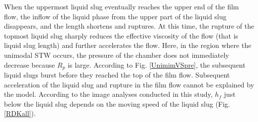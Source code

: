 \documentclass[aps,pre,preprint,groupedaddress,showkeys]{revtex4-2}
\begin{document}
When the uppermost liquid slug eventually reaches the upper end of the film flow, the inflow of the liquid phase from the upper part of the liquid slug disappears, and the length shortens and ruptures.
At this time, the rupture of the topmost liquid slug sharply reduces the effective viscosity of the flow (that is liquid slug length) and further accelerates the flow.
Here, in the region where the unimodal STW occurs, the pressure of the chamber does not immediately decrease because $ R_p $ is large.
According to Fig. \ref{UnimimVSpre}, the subsequent liquid slugs burst before they reached the top of the film flow.
Subsequent acceleration of the liquid slug and rupture in the film flow cannot be explained by the \cite{kanno 2018} model.
According to the image analyses conducted in this study, $ h_f $ just below the liquid slug depends on the moving speed of the liquid slug (Fig. \ref{RDKall}).
\end{document}
